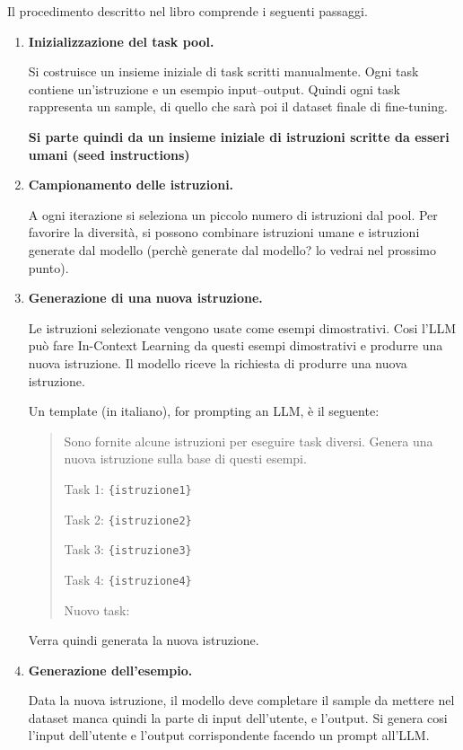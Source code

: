 Il procedimento descritto nel libro comprende
i seguenti passaggi.

\begin{enumerate}
    \item \textbf{Inizializzazione del task pool.}

    Si costruisce un insieme iniziale di task
    scritti manualmente. Ogni task contiene
    un'istruzione e un esempio input--output.
    Quindi ogni task rappresenta un sample, di quello che sarà poi il dataset finale di fine-tuning.


    \textbf{Si parte quindi da un insieme iniziale di istruzioni scritte da esseri umani (seed instructions)}


    \item \textbf{Campionamento delle istruzioni.}

    A ogni iterazione si seleziona un piccolo numero
    di istruzioni dal pool. Per favorire la diversità,
    si possono combinare istruzioni umane
    e istruzioni generate dal modello (perchè generate dal modello? lo vedrai nel prossimo punto).

    \item \textbf{Generazione di una nuova istruzione.}

    Le istruzioni selezionate vengono usate come esempi dimostrativi. Cosi l'LLM
    può fare In-Context Learning da questi esempi dimostrativi e produrre una nuova istruzione.
    Il modello riceve la richiesta di produrre
    una nuova istruzione.

    Un template (in italiano), for prompting an LLM, è il seguente:
    \begin{quote}
    Sono fornite alcune istruzioni per eseguire task diversi.
    Genera una nuova istruzione sulla base di questi esempi.

    Task 1: \texttt{\{istruzione1\}}

    Task 2: \texttt{\{istruzione2\}}

    Task 3: \texttt{\{istruzione3\}}

    Task 4: \texttt{\{istruzione4\}}

    Nuovo task:
    \end{quote}

    Verra quindi generata la nuova istruzione.

    \item \textbf{Generazione dell'esempio.}

    Data la nuova istruzione, il modello deve completare il sample da mettere nel dataset manca quindi la parte di input dell'utente, e l'output. Si genera cosi l'input dell'utente
    e l'output corrispondente facendo un prompt all'LLM.


\end{enumerate}
